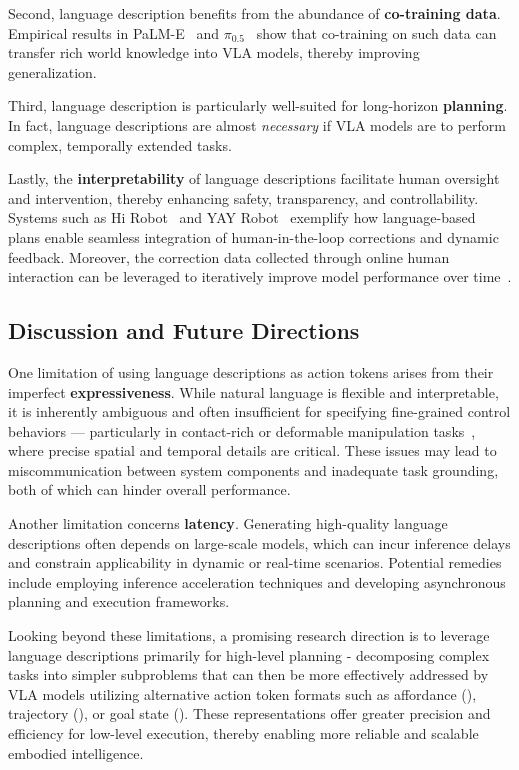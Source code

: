 \documentclass[10pt, a4paper, logo, copyright]{googledeepmind} %
\begin{document}
Second, language description benefits from the abundance of \textbf{co-training data}. Empirical results in PaLM-E~\cite{driess2023palme} and $\pi_{0.5}$~\cite{intelligence2025pi05visionlanguageactionmodelopenworld} show that co-training on such data can transfer rich world knowledge into VLA models, thereby improving generalization.

Third, language description is particularly well-suited for long-horizon \textbf{planning}. In fact, language descriptions are almost \emph{necessary} if VLA models are to perform complex, temporally extended tasks.

Lastly, the \textbf{interpretability} of language descriptions facilitate human oversight and intervention, thereby enhancing safety, transparency, and controllability. Systems such as Hi Robot~\cite{shi2025hi} and YAY Robot~\cite{shi2024yell} exemplify how language-based plans enable seamless integration of human-in-the-loop corrections and dynamic feedback. Moreover, the correction data collected through online human interaction can be leveraged to iteratively improve model performance over time~\cite{rth2024arxiv}.

\subsection{Discussion and Future Directions}

One limitation of using language descriptions as action tokens arises from their imperfect \textbf{expressiveness}. While natural language is flexible and interpretable, it is inherently ambiguous and often insufficient for specifying fine-grained control behaviors --- particularly in contact-rich or deformable manipulation tasks~\cite{Lin_2023, du2023video}, where precise spatial and temporal details are critical. These issues may lead to miscommunication between system components and inadequate task grounding, both of which can hinder overall performance.

Another limitation concerns \textbf{latency}. Generating high-quality language descriptions often depends on large-scale models, which can incur inference delays and constrain applicability in dynamic or real-time scenarios. Potential remedies include employing inference acceleration techniques and developing asynchronous planning and execution frameworks.

Looking beyond these limitations, a promising research direction is to leverage language descriptions primarily for high-level planning - decomposing complex tasks into simpler subproblems that can then be more effectively addressed by VLA models utilizing alternative action token formats such as affordance (), trajectory (), or goal state (). These representations offer greater precision and efficiency for low-level execution, thereby enabling more reliable and scalable embodied intelligence.
\end{document}

